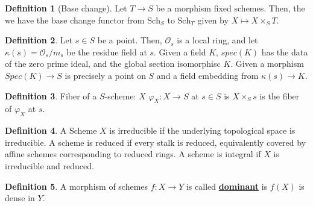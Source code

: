 \documentclass{article}
\theoremstyle{definition}
\theoremstyle{definition}
\newtheorem{definition}{Definition}[theorem]
\theoremstyle{definition}
\theoremstyle{definition}
\theoremstyle{definition}
\theoremstyle{definition}
\theoremstyle{definition}
\begin{document}
\begin{tcolorbox}[colback=purple!5!white,colframe=purple!75!black]
\begin{definition}[Base change]
Let $T\to S$ be a morphism fixed schemes. Then, the we have the base change functor from $\textrm{Sch}_S$ to $\textrm{Sch}_T$ given by $X\mapsto X\times_S T$. 
\end{definition}
\end{tcolorbox}



\begin{tcolorbox}[colback=purple!5!white,colframe=purple!75!black]
\begin{definition}
Let $s\in S$ be a point. Then, $\mathcal{O}_s$ is a local ring, and let $\kappa(s)=\mathcal{O}_s/m_s$ be the residue field at $s$. Given a field $K$, $spec(K)$ has the data of the zero prime ideal, and the global section isomorphisc $K$. Given a morphism $Spec(K)\to S$ is precisely a point on $S$ and a field embedding from $\kappa(s)\to K$. 
\end{definition}
\end{tcolorbox}


\begin{tcolorbox}[colback=purple!5!white,colframe=purple!75!black]
\begin{definition}
Fiber of a $S$-scheme: $X$ $\varphi_X: X\to S$ at $s\in S$ is $X\times_S s$ is the fiber of $\varphi_X$ at $s$. 
\end{definition}
\end{tcolorbox}


\begin{tcolorbox}[colback=purple!5!white,colframe=purple!75!black]
\begin{definition}
A Scheme $X$ is irreducible if the underlying topological space is irreducible. A scheme is reduced if every stalk is reduced, equivalently covered by affine schemes corresponding to reduced rings.  A scheme is integral if $X$ is irreducible and reduced. 
\end{definition}
\end{tcolorbox}


\begin{tcolorbox}[colback=purple!5!white,colframe=purple!75!black]
\begin{definition}
A morphism of schemes $f: X\to Y$ is called \underline{\textbf{dominant}} is $f(X)$ is dense in $Y$. 
\end{definition}
\end{tcolorbox}
\end{document}
